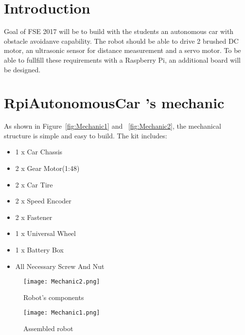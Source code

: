 \documentclass[
12pt, %
a4paper, %
oneside, %
headinclude,footinclude, %
BCOR5mm, %
]{scrartcl}
\begin{document}
%
\newpage
%


\section{Introduction}
Goal of FSE 2017 will be to build with the students an autonomous car with obstacle avoidanve capability. The robot should be able to drive 2 brushed DC motor, an ultrasonic sensor for distance measurement and a servo motor. To be able to fullfill these requirements with a Raspberry Pi, an additional board will be designed.


\section{RpiAutonomousCar 's mechanic}
As shown in Figure~\vref{fig:Mechanic1} and ~\vref{fig:Mechanic2}, the mechanical structure is simple and easy to build. The kit includes:
\begin{itemize}
\item 1 x Car Chassis 
\item 2 x Gear Motor(1:48) 
\item 2 x Car Tire 
\item 2 x Speed Encoder 
\item 2 x Fastener 
\item 1 x Universal Wheel 
\item 1 x Battery Box 
\item All Necessary Screw And Nut
\end{itemize}

\begin{figure}[h]
  \texttt{[image: Mechanic2.png]}
  \caption{Robot's components}\label{fig:Mechanic2}
\endminipage\hfill
{}
  \texttt{[image: Mechanic1.png]}
  \caption{Assembled robot}\label{fig:Mechanic1}
\endminipage
\end{figure}


\end{document}
